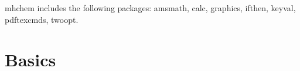 \documentclass[a4paper,notitlepage]{scrreprt}
\begin{document}
\medskip

\noindent
mhchem includes the following packages: amsmath, calc, graphics, ifthen, keyval, pdftexcmds, twoopt.  



\section{Basics}

\noindent
\begin{SideBySideExample}[xrightmargin=2cm]
\end{SideBySideExample}

\medskip
\begin{SideBySideExample}[xrightmargin=2cm]
\end{SideBySideExample}

\medskip
\begin{SideBySideExample}[xrightmargin=2cm]
\end{SideBySideExample}

\medskip
\begin{SideBySideExample}[xrightmargin=2cm]
\end{SideBySideExample}

\medskip
\begin{SideBySideExample}[xrightmargin=2cm]
\end{SideBySideExample}

\medskip
\begin{SideBySideExample}[xrightmargin=2cm]
  \ce{[AgCl2]-}
\end{SideBySideExample}

\medskip
\begin{SideBySideExample}[xrightmargin=2cm]
\end{SideBySideExample}

\medskip
\begin{SideBySideExample}[xrightmargin=2cm]
\end{SideBySideExample}

\medskip
\begin{SideBySideExample}[xrightmargin=2cm]
\end{SideBySideExample}

\medskip
\begin{SideBySideExample}[xrightmargin=2cm]
\end{SideBySideExample}

\medskip
\begin{SideBySideExample}[xrightmargin=2cm]
\end{SideBySideExample}
\end{document}
